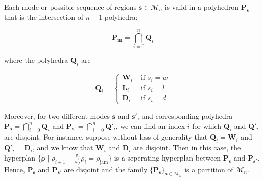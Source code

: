 \noindent Each mode or possible sequence of regions $\boldsymbol s \in \mathcal{M}_{n}$ is valid in a polyhedron $\textbf{P}_{\boldsymbol s}$ that is the intersection of $n+1$ polyhedra:

\begin{equation}
\textbf{P}_{\boldsymbol m}=\bigcap_{i=0}^{n} \textbf{Q}_{i}
\label{eq:Hrepresentation}
\end{equation}

\noindent where the polyhedra $\textbf{Q}_{i}$ are

\begin{equation}
\textbf{Q}_{i}=
\begin{cases}
\textbf{W}_{i} & \text{ if } s_{i}=w\\
\textbf{L}_{i} & \text{ if } s_{i}=l\\
\textbf{D}_{i} & \text{ if } s_{i}=d
\end{cases}
\label{eq:Hrepresentation2}
\end{equation}


Moreover, for two different modes $\boldsymbol s$ and $\boldsymbol s'$, and corresponding polyhedra $\textbf{P}_{\boldsymbol s}=\bigcap_{i=0}^{n} \textbf{Q}_{i}$ and $\textbf{P}_{\boldsymbol s'}=\bigcap_{i=0}^{n} \textbf{Q}'_{i}$, we can find an index $i$ for which $\textbf{Q}_{i}$ and $\textbf{Q}'_{i}$ are disjoint. For instance, suppose without loss of generality that $\textbf{Q}_{i}=\textbf{W}_{i}$ and $\textbf{Q}'_{i}=\textbf{D}_{i}$, and we know that $\textbf{W}_{i}$ and $\textbf{D}_{i}$ are disjoint. Then in this case, the hyperplan $\{\boldsymbol \rho\mid\rho_{i+1} + \frac{v_{f}}{\omega_{f}}\rho_{i} = \rho_{\text{jam}}\}$ is a seperating hyperplan between $\textbf{P}_{\boldsymbol s}$ and $\textbf{P}_{\boldsymbol s'}$. Hence, $\textbf{P}_{\boldsymbol s}$ and $\textbf{P}_{\boldsymbol s'}$ are disjoint and the family $\{\textbf{P}_{\boldsymbol s}\}_{\boldsymbol s \in \mathcal{M}_{n}}$ is a partition of $\mathcal{M}_{n}$.